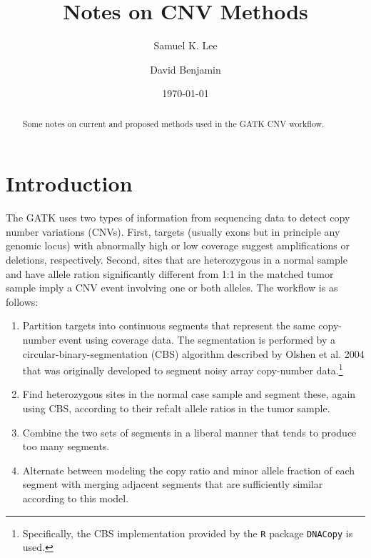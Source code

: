 \documentclass[nofootinbib,amssymb,amsmath]{revtex4}
\begin{document}
\title{Notes on CNV Methods}
\author{Samuel K. Lee}


\author{David Benjamin}

\date{\today}

\begin{abstract}
Some notes on current and proposed methods used in the GATK CNV workflow.
\end{abstract}

\maketitle



\section{Introduction}\label{introduction}

The GATK uses two types of information from sequencing data to detect copy number variations (CNVs).  First, targets (usually exons but in principle any genomic locus) with abnormally high or low coverage suggest amplifications or deletions, respectively.  Second, sites that are heterozygous in a normal sample and have allele ration significantly different from 1:1 in the matched tumor sample imply a CNV event involving one or both alleles.  The workflow is as follows:

\begin{enumerate}

\item Partition targets into continuous segments that represent the same copy-number event using coverage data.  The segmentation is performed by a circular-binary-segmentation (CBS) algorithm described by Olshen et al. 2004 that was originally developed to segment noisy array copy-number data.\footnote{Specifically, the CBS implementation provided by the \texttt{R} package \texttt{DNACopy} is used.}

\item Find heterozygous sites in the normal case sample and segment these, again using CBS, according to their ref:alt allele ratios in the tumor sample.

\item Combine the two sets of segments in a liberal manner that tends to produce too many segments.

\item Alternate between modeling the copy ratio and minor allele fraction of each segment with merging adjacent segments that are sufficiently similar according to this model.

\end{enumerate}
\end{document}
